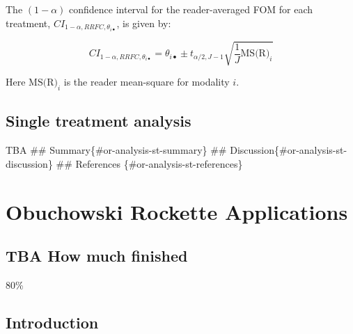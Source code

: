 \documentclass[
]{book}
\begin{document}
The \((1-\alpha)\) confidence interval for the reader-averaged FOM for each treatment, \(CI_{1-\alpha,RRFC,\theta_{i \bullet}}\), is given by:

\begin{equation}
CI_{1-\alpha,RRFC,\theta_{i \bullet}} = \theta_{i \bullet} \pm t_{\alpha/2, J-1}\sqrt{\textstyle\frac{1}{J}\text{MS(R)}_i}
\label{eq:CIRRFCIndTrt}
\end{equation}

Here \(\text{MS(R)}_i\) is the reader mean-square for modality \(i\).

\hypertarget{or-analysis-st-single-treatment}{%
\section{Single treatment analysis}\label{or-analysis-st-single-treatment}}

TBA
\#\# Summary\{\#or-analysis-st-summary\}
\#\# Discussion\{\#or-analysis-st-discussion\}
\#\# References \{\#or-analysis-st-references\}

\hypertarget{or-applications}{%
\chapter{Obuchowski Rockette Applications}\label{or-applications}}

\hypertarget{or-applications-how-much-finished}{%
\section{TBA How much finished}\label{or-applications-how-much-finished}}

80\%

\hypertarget{or-applications-introduction}{%
\section{Introduction}\label{or-applications-introduction}}
\end{document}
